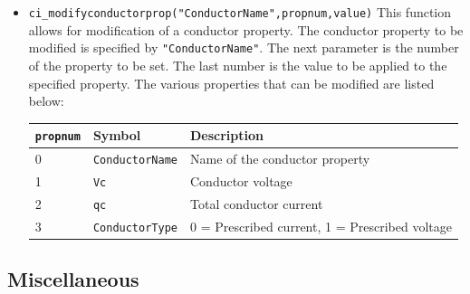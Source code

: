 \begin{itemize}
\item \texttt{ci\_modifyconductorprop("ConductorName",propnum,value)} This function
allows for modification of a conductor property. The conductor
property to be modified is specified by \texttt{"ConductorName"}.
The next parameter is the number of the property to be set. The
last number is the value to be applied to the specified property.
The various properties that can be modified are listed below:


\begin{tabular}{lll}
\texttt{propnum} & Symbol & Description \\ \hline
  0 & \texttt{ConductorName} & Name of the conductor property \\
  1 & \texttt{Vc} &  Conductor voltage \\
  2 & \texttt{qc} &  Total conductor current \\
  3 & \texttt{ConductorType} & 0 = Prescribed current, 1 = Prescribed voltage
\end{tabular}

\end{itemize}

\subsection{Miscellaneous}

